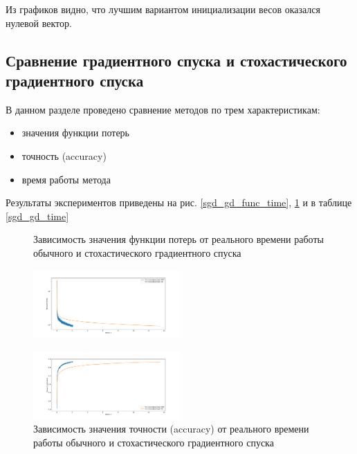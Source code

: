\documentclass[a4paper, 11pt]{article}
\begin{document}
            Из графиков видно, что лучшим вариантом инициализации весов оказался нулевой вектор.
            
        \subsection{Сравнение градиентного спуска и стохастического градиентного спуска}
            В данном разделе проведено сравнение методов по трем характеристикам:
            \begin{itemize}
                \item значения функции потерь
                \item точность (accuracy)
                \item время работы метода
            \end{itemize}
           Результаты экспериментов приведены на рис. \ref{sgd_gd_func_time}, \ref{sgd_gd_acc_time} и в таблице \ref{sgd_gd_time}
           \begin{figure}[H] \label{exp1}
               \begin{multicols}{2}
                   \begin{center}
                       \caption{Зависимость значения функции потерь от реального времени работы обычного и стохастического градиентного спуска} \label{sgd_gd_func_time}
                       \includegraphics[width=0.5\textwidth, height=0.25\textheight]{../graphs/SGD_GD_func_alpha=1_beta=0,001_bs=1024.pdf}
                       
                       \caption{Зависимость значения точности (accuracy) от реального времени работы обычного и стохастического градиентного спуска} \label{sgd_gd_acc_time}
                       \includegraphics[width=0.5\textwidth, height=0.25\textheight]{../graphs/SGD_GD_accuracy_alpha=1_beta=0,001_bs=1024.pdf}
                   \end{center}
               \end{multicols}
           \end{figure}
       
\end{document}

